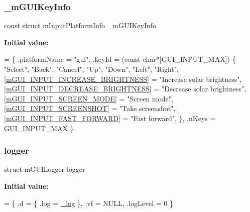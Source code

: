\subsubsection{\texorpdfstring{\+\_\+m\+G\+U\+I\+Key\+Info}{\_mGUIKeyInfo}}
{\footnotesize\ttfamily const struct m\+Input\+Platform\+Info \+\_\+m\+G\+U\+I\+Key\+Info\hspace{0.3cm}{\ttfamily [static]}}

{\bfseries Initial value\+:}
\begin{DoxyCode}
= \{
    .platformName = \textcolor{stringliteral}{"gui"},
    .keyId = (\textcolor{keyword}{const} \textcolor{keywordtype}{char}*[GUI\_INPUT\_MAX]) \{
        \textcolor{stringliteral}{"Select"},
        \textcolor{stringliteral}{"Back"},
        \textcolor{stringliteral}{"Cancel"},
        \textcolor{stringliteral}{"Up"},
        \textcolor{stringliteral}{"Down"},
        \textcolor{stringliteral}{"Left"},
        \textcolor{stringliteral}{"Right"},
        [\mbox{\hyperlink{gui-runner_8h_ac190200f37f0499dccb86ebb1d15ced0a3af7363535b2615b88ab3ec4a197ee5d}{mGUI\_INPUT\_INCREASE\_BRIGHTNESS}}] = \textcolor{stringliteral}{"Increase solar brightness"},
        [\mbox{\hyperlink{gui-runner_8h_ac190200f37f0499dccb86ebb1d15ced0ae54a7af768df3f7c793c07652b8d001d}{mGUI\_INPUT\_DECREASE\_BRIGHTNESS}}] = \textcolor{stringliteral}{"Decrease solar brightness"},
        [\mbox{\hyperlink{gui-runner_8h_ac190200f37f0499dccb86ebb1d15ced0ac63fa69551e8690d0651bc7dcc42c19f}{mGUI\_INPUT\_SCREEN\_MODE}}] = \textcolor{stringliteral}{"Screen mode"},
        [\mbox{\hyperlink{gui-runner_8h_ac190200f37f0499dccb86ebb1d15ced0aa808e86fce3835db3cabc04420409eaf}{mGUI\_INPUT\_SCREENSHOT}}] = \textcolor{stringliteral}{"Take screenshot"},
        [\mbox{\hyperlink{gui-runner_8h_ac190200f37f0499dccb86ebb1d15ced0a309dd664e34ad9e20a0884748ba49b50}{mGUI\_INPUT\_FAST\_FORWARD}}] = \textcolor{stringliteral}{"Fast forward"},
    \},
    .nKeys = GUI\_INPUT\_MAX
\}
\end{DoxyCode}
\mbox{\label{gui-runner_8c_a4b3171e336aa70bc7c85830e85ac6d3e}} 
\subsubsection{\texorpdfstring{logger}{logger}}
{\footnotesize\ttfamily struct m\+G\+U\+I\+Logger  logger\hspace{0.3cm}{\ttfamily [static]}}

{\bfseries Initial value\+:}
\begin{DoxyCode}
= \{
    .d = \{
        .log = \mbox{\hyperlink{gui-runner_8c_abd0ecb64e5e72d771823f2e8aa966fc6}{\_log}}
    \},
    .vf = NULL,
    .logLevel = 0
\}
\end{DoxyCode}
